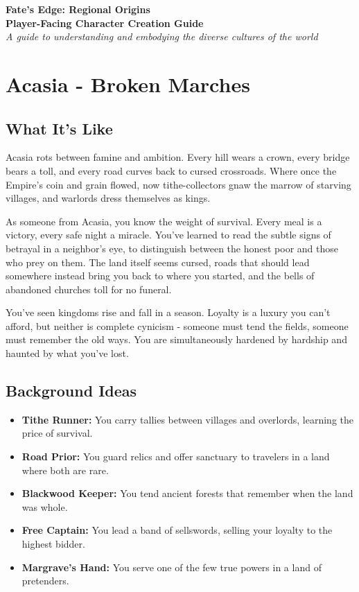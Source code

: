 \documentclass[11pt]{article}
\newcommand{\region}[1]{\section*{#1}}
\newcommand{\subregion}[1]{\subsection*{#1}}
\begin{document}
\begin{center}
{\Huge \textbf{Fate's Edge: Regional Origins}}\\
\vspace{0.5cm}
{\Large \textbf{Player-Facing Character Creation Guide}}\\
\vspace{0.3cm}
{\itshape A guide to understanding and embodying the diverse cultures of the world}
\end{center}

\vspace{1cm}

\tableofcontents

\newpage

\region{Acasia - Broken Marches}

\begin{multicols}{2}
\subregion{What It's Like}

Acasia rots between famine and ambition. Every hill wears a crown, every bridge bears a toll, and every road curves back to cursed crossroads. Where once the Empire's coin and grain flowed, now tithe-collectors gnaw the marrow of starving villages, and warlords dress themselves as kings.

As someone from Acasia, you know the weight of survival. Every meal is a victory, every safe night a miracle. You've learned to read the subtle signs of betrayal in a neighbor's eye, to distinguish between the honest poor and those who prey on them. The land itself seems cursed, roads that should lead somewhere instead bring you back to where you started, and the bells of abandoned churches toll for no funeral.

You've seen kingdoms rise and fall in a season. Loyalty is a luxury you can't afford, but neither is complete cynicism - someone must tend the fields, someone must remember the old ways. You are simultaneously hardened by hardship and haunted by what you've lost.

\columnbreak

\subregion{Background Ideas}

\begin{itemize}[leftmargin=*]
    \item \textbf{Tithe Runner:} You carry tallies between villages and overlords, learning the price of survival.
    \item \textbf{Road Prior:} You guard relics and offer sanctuary to travelers in a land where both are rare.
    \item \textbf{Blackwood Keeper:} You tend ancient forests that remember when the land was whole.
    \item \textbf{Free Captain:} You lead a band of sellswords, selling your loyalty to the highest bidder.
    \item \textbf{Margrave's Hand:} You serve one of the few true powers in a land of pretenders.
\end{itemize}


\end{multicols}
\end{document}
